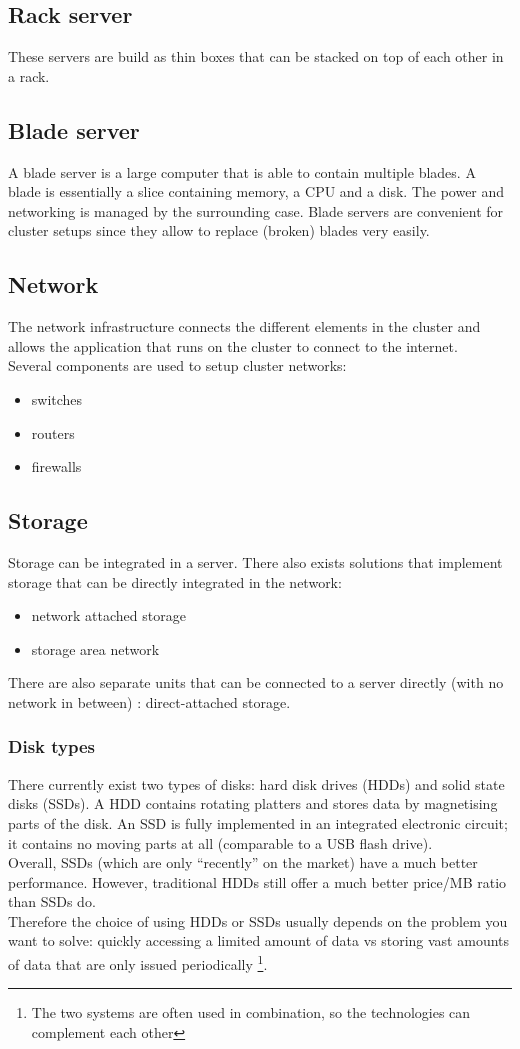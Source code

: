 \documentclass[12pt]{report}
\begin{document}
\subsection{Rack server}
These servers are build as thin boxes that can be stacked on top of each other in a rack.
\subsection{Blade server}
A blade server is a large computer that is able to contain multiple
  blades. A blade is essentially a slice containing memory, a CPU and a
  disk. The power and networking is managed by the surrounding case.
 Blade servers are convenient for cluster setups since they
   allow to replace (broken) blades very easily.
\subsection{Network}
The network infrastructure connects the different elements in the
cluster and allows the application
that runs on the cluster to connect to the internet.\\
Several components are used to setup cluster networks:
\begin{itemize}
\item switches
\item routers
\item firewalls
\end{itemize}
\subsection{Storage}
Storage can be integrated in a server. There 
also exists solutions that implement storage that can be directly
integrated in the network:
\begin{itemize}
\item network attached storage 
\item storage area network
\end{itemize}
There are also separate units that can be connected to a server
directly (with no network in between) : direct-attached storage.
\subsubsection{Disk types}
There currently exist two types of disks: hard disk drives (HDDs) and
solid state disks (SSDs). A HDD contains rotating platters and 
stores data by magnetising parts of the disk. An SSD is fully
implemented in an integrated electronic circuit; it contains no moving
parts at all (comparable to a USB flash drive).\\
Overall, SSDs (which are only ``recently'' on the market) have a much better
performance. However, traditional HDDs still offer a much better
price/MB ratio than SSDs do.\\
Therefore the choice of using HDDs or SSDs usually depends on the
problem you want to solve: quickly accessing a limited amount of data
vs storing vast amounts of data that are only issued
periodically \footnote{The two systems are often used in combination,
so the technologies can complement each other}.
\end{document}
